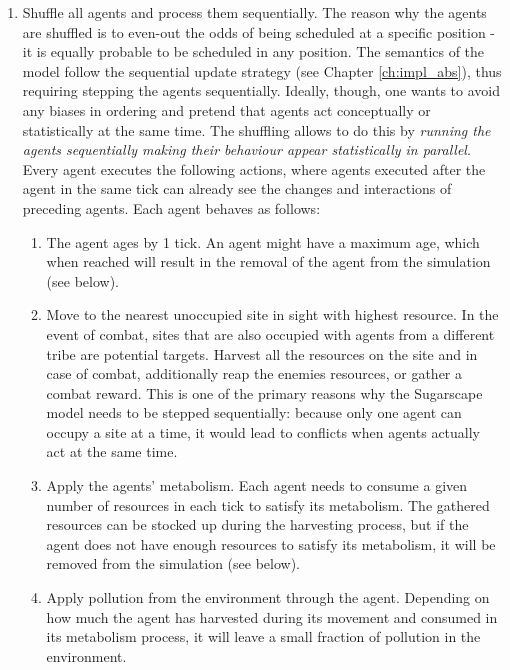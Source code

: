 \begin{enumerate}
	\item Shuffle all agents and process them sequentially. The reason why the agents are shuffled is to even-out the odds of being scheduled at a specific position - it is equally probable to be scheduled in any position. The semantics of the model follow the sequential update strategy (see Chapter \ref{ch:impl_abs}), thus requiring stepping the agents sequentially. Ideally, though, one wants to avoid any biases in ordering and pretend that agents act conceptually or statistically at the same time. The shuffling allows to do this by \textit{running the agents sequentially making their behaviour appear statistically in parallel}. Every agent executes the following actions, where agents executed after the agent in the same tick can already see the changes and interactions of preceding agents. Each agent behaves as follows:
	
	\begin{enumerate}
		\item The agent ages by 1 tick. An agent might have a maximum age, which when reached will result in the removal of the agent from the simulation (see below).
	
		\item Move to the nearest unoccupied site in sight with highest resource. In the event of combat, sites that are also occupied with agents from a different tribe are potential targets. Harvest all the resources on the site and in case of combat, additionally reap the enemies resources, or gather a combat reward. This is one of the primary reasons why the Sugarscape model needs to be stepped sequentially: because only one agent can occupy a site at a time, it would lead to conflicts when agents actually act at the same time.

		\item Apply the agents' metabolism. Each agent needs to consume a given number of resources in each tick to satisfy its metabolism. The gathered resources can be stocked up during the harvesting process, but if the agent does not have enough resources to satisfy its metabolism, it will be removed from the simulation (see below).
		
		\item Apply pollution from the environment through the agent. Depending on how much the agent has harvested during its movement and consumed in its metabolism process, it will leave a small fraction of pollution in the environment.
		

\end{enumerate}
\end{enumerate}
